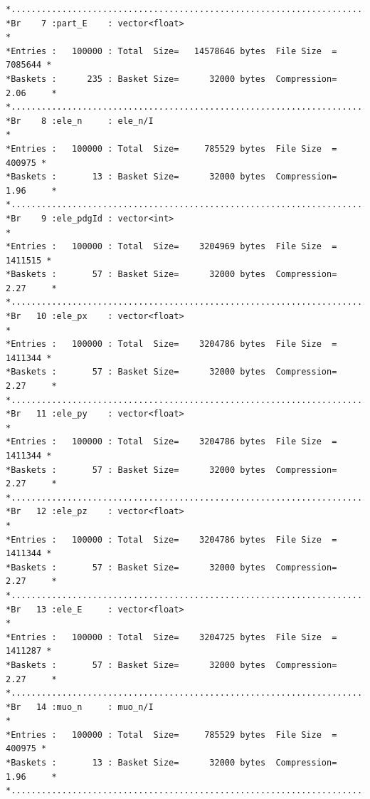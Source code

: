 {\begin{verbatim}
*............................................................................*
*Br    7 :part_E    : vector<float>                                          *
*Entries :   100000 : Total  Size=   14578646 bytes  File Size  =    7085644 *
*Baskets :      235 : Basket Size=      32000 bytes  Compression=   2.06     *
*............................................................................*
*Br    8 :ele_n     : ele_n/I                                                *
*Entries :   100000 : Total  Size=     785529 bytes  File Size  =     400975 *
*Baskets :       13 : Basket Size=      32000 bytes  Compression=   1.96     *
*............................................................................*
*Br    9 :ele_pdgId : vector<int>                                            *
*Entries :   100000 : Total  Size=    3204969 bytes  File Size  =    1411515 *
*Baskets :       57 : Basket Size=      32000 bytes  Compression=   2.27     *
*............................................................................*
*Br   10 :ele_px    : vector<float>                                          *
*Entries :   100000 : Total  Size=    3204786 bytes  File Size  =    1411344 *
*Baskets :       57 : Basket Size=      32000 bytes  Compression=   2.27     *
*............................................................................*
*Br   11 :ele_py    : vector<float>                                          *
*Entries :   100000 : Total  Size=    3204786 bytes  File Size  =    1411344 *
*Baskets :       57 : Basket Size=      32000 bytes  Compression=   2.27     *
*............................................................................*
*Br   12 :ele_pz    : vector<float>                                          *
*Entries :   100000 : Total  Size=    3204786 bytes  File Size  =    1411344 *
*Baskets :       57 : Basket Size=      32000 bytes  Compression=   2.27     *
*............................................................................*
*Br   13 :ele_E     : vector<float>                                          *
*Entries :   100000 : Total  Size=    3204725 bytes  File Size  =    1411287 *
*Baskets :       57 : Basket Size=      32000 bytes  Compression=   2.27     *
*............................................................................*
*Br   14 :muo_n     : muo_n/I                                                *
*Entries :   100000 : Total  Size=     785529 bytes  File Size  =     400975 *
*Baskets :       13 : Basket Size=      32000 bytes  Compression=   1.96     *
*............................................................................*

\end{verbatim}}
